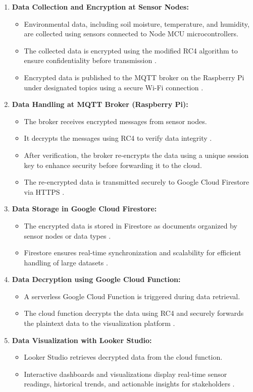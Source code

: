 \documentclass[runningheads]{llncs}
\begin{document}
\begin{enumerate}
    \item \textbf{Data Collection and Encryption at Sensor Nodes:}
    \begin{itemize}
        \item Environmental data, including soil moisture, temperature, and humidity, are collected using sensors connected to Node MCU microcontrollers.
        \item The collected data is encrypted using the modified RC4 algorithm to ensure confidentiality before transmission \cite{ref15}.
        \item Encrypted data is published to the MQTT broker on the Raspberry Pi under designated topics using a secure Wi-Fi connection \cite{ref21}.
    \end{itemize}
    \item \textbf{Data Handling at MQTT Broker (Raspberry Pi):}
    \begin{itemize}
        \item The broker receives encrypted messages from sensor nodes.
        \item It decrypts the messages using RC4 to verify data integrity \cite{ref16}.
        \item After verification, the broker re-encrypts the data using a unique session key to enhance security before forwarding it to the cloud.
        \item The re-encrypted data is transmitted securely to Google Cloud Firestore via HTTPS \cite{ref22}.
    \end{itemize}
    \item \textbf{Data Storage in Google Cloud Firestore:}
    \begin{itemize}
        \item The encrypted data is stored in Firestore as documents organized by sensor nodes or data types \cite{ref19}.
        \item Firestore ensures real-time synchronization and scalability for efficient handling of large datasets \cite{ref20}.
    \end{itemize}
    \item \textbf{Data Decryption using Google Cloud Function:}
    \begin{itemize}
        \item A serverless Google Cloud Function is triggered during data retrieval.
        \item The cloud function decrypts the data using RC4 and securely forwards the plaintext data to the visualization platform \cite{ref22}.
    \end{itemize}
    \item \textbf{Data Visualization with Looker Studio:}
    \begin{itemize}
        \item Looker Studio retrieves decrypted data from the cloud function.
        \item Interactive dashboards and visualizations display real-time sensor readings, historical trends, and actionable insights for stakeholders \cite{ref20}.
    \end{itemize}
\end{enumerate}
\end{document}

